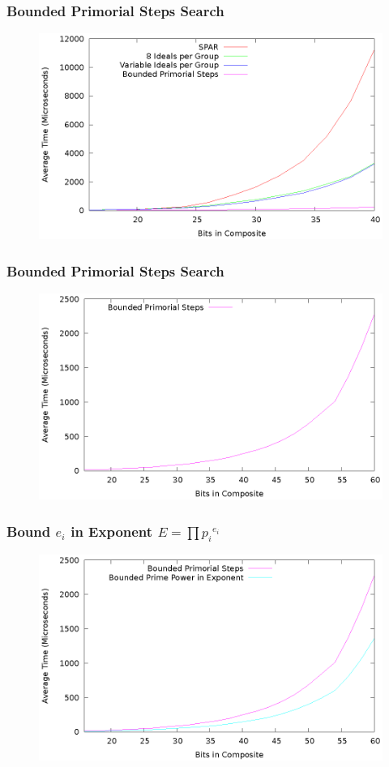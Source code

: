 \documentclass{beamer}
\begin{document}
\begin{frame}
\frametitle{Bounded Primorial Steps Search}
\begin{figure}
\includegraphics[scale=0.86]{spar-to-sspar}
\end{figure}
\end{frame}
\begin{frame}
\frametitle{Bounded Primorial Steps Search}
\begin{figure}
\includegraphics[scale=0.86]{sspar-theoretical}
\end{figure}
\end{frame}
\begin{frame}
\frametitle{Bound $e_i$ in Exponent $E = \prod {p_i}^{e_i}$}
\begin{figure}
\includegraphics[scale=0.86]{sspar-power-bound}
\end{figure}
\end{frame}
\end{document}
